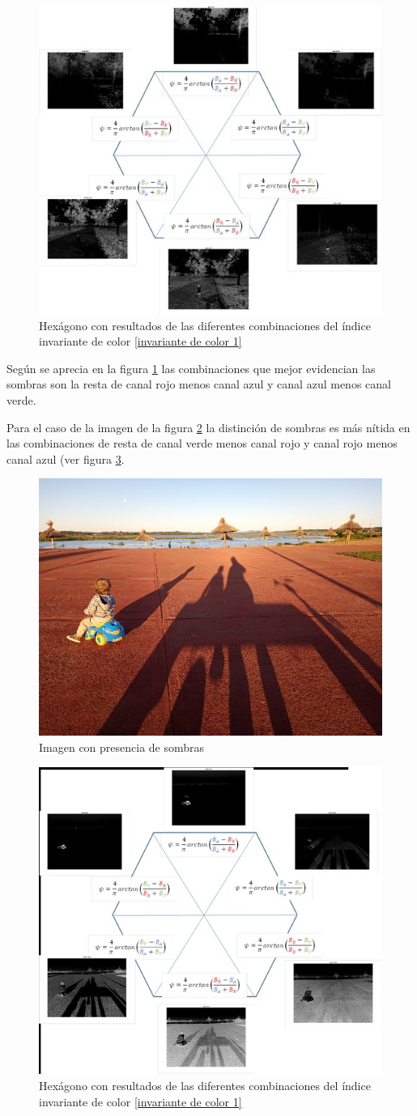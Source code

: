 \begin{figure}[H]
    \centering
    \includegraphics[width=0.5\linewidth]{Imagenes//Informes/info3_hexagono.JPG}
    \caption{Hexágono con resultados de las diferentes combinaciones del índice invariante de color \ref{invariante de color 1}}
    \label{hexagono1}
\end{figure}

Según se aprecia en la figura \ref{hexagono1} las combinaciones que mejor evidencian las sombras son la resta de canal rojo menos canal azul y canal azul menos canal verde. 

Para el caso de la imagen de la figura \ref{costanera} la distinción de sombras es más nítida en las combinaciones de resta de canal verde menos canal rojo y canal rojo menos canal azul (ver figura \ref{hexagono2}.

\begin{figure}[H]
    \centering
    \includegraphics[width=0.5\linewidth]{Imagenes//Informes/costanera_garupa.JPG}
    \caption{Imagen con presencia de sombras}
    \label{costanera}
\end{figure}

\begin{figure}[H]
    \centering
    \includegraphics[width=0.5\linewidth]{Imagenes//Informes/info3_hexagono2.JPG}
    \caption{Hexágono con resultados de las diferentes combinaciones del índice invariante de color \ref{invariante de color 1}}
    \label{hexagono2}
\end{figure}

